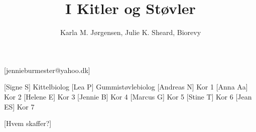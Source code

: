 \documentclass[a4paper,12pt]{article}
\title{I Kitler og Støvler}
\author{Karla M. Jørgensen, Julie K. Sheard, Biorevy}
\begin{document}
\maketitle

\begin{texxers}
	[jennieburmester@yahoo.dk]
\end{texxers}

\begin{roles}
	[Signe S] Kittelbiolog
	[Lea P] Gummistøvlebiolog
	[Andreas N] Kor 1
	[Anna Aa] Kor 2
	[Helene E] Kor 3
	[Jennie B] Kor 4
	[Marcus G] Kor 5
	[Stine T] Kor 6	
	[Jean ES] Kor 7	
\end{roles}


\begin{props}
	[Hvem skaffer?] 
\end{props}
\end{document}
